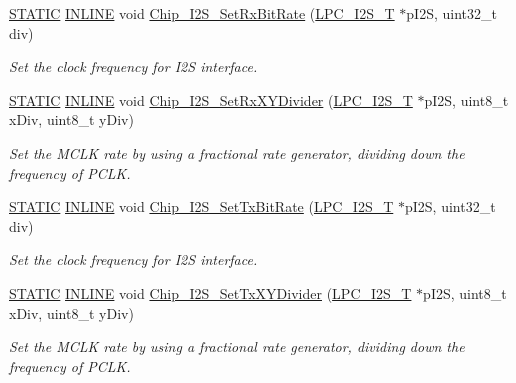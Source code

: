 \begin{DoxyCompactItemize}
\hyperlink{group__LPC__Types__Public__Macros_ga10b2d890d871e1489bb02b7e70d9bdfb}{S\+T\+A\+T\+IC} \hyperlink{group__LPC__Types__Public__Types_ga2eb6f9e0395b47b8d5e3eeae4fe0c116}{I\+N\+L\+I\+NE} void \hyperlink{group__I2S__17XX__40XX_gaf18685ebc3f86581fd7075fafe4c72e7}{Chip\+\_\+\+I2\+S\+\_\+\+Set\+Rx\+Bit\+Rate} (\hyperlink{structLPC__I2S__T}{L\+P\+C\+\_\+\+I2\+S\+\_\+T} $\ast$p\+I2S, uint32\+\_\+t div)
\begin{DoxyCompactList}\small\item\em Set the clock frequency for I2S interface. \end{DoxyCompactList}\item 
\hyperlink{group__LPC__Types__Public__Macros_ga10b2d890d871e1489bb02b7e70d9bdfb}{S\+T\+A\+T\+IC} \hyperlink{group__LPC__Types__Public__Types_ga2eb6f9e0395b47b8d5e3eeae4fe0c116}{I\+N\+L\+I\+NE} void \hyperlink{group__I2S__17XX__40XX_gafd2bc55fb29ea5f082d5ae3b5794f605}{Chip\+\_\+\+I2\+S\+\_\+\+Set\+Rx\+X\+Y\+Divider} (\hyperlink{structLPC__I2S__T}{L\+P\+C\+\_\+\+I2\+S\+\_\+T} $\ast$p\+I2S, uint8\+\_\+t x\+Div, uint8\+\_\+t y\+Div)
\begin{DoxyCompactList}\small\item\em Set the M\+C\+LK rate by using a fractional rate generator, dividing down the frequency of P\+C\+LK. \end{DoxyCompactList}\item 
\hyperlink{group__LPC__Types__Public__Macros_ga10b2d890d871e1489bb02b7e70d9bdfb}{S\+T\+A\+T\+IC} \hyperlink{group__LPC__Types__Public__Types_ga2eb6f9e0395b47b8d5e3eeae4fe0c116}{I\+N\+L\+I\+NE} void \hyperlink{group__I2S__17XX__40XX_ga4ab6d7b26edf92c1b7bcb7f6f9326888}{Chip\+\_\+\+I2\+S\+\_\+\+Set\+Tx\+Bit\+Rate} (\hyperlink{structLPC__I2S__T}{L\+P\+C\+\_\+\+I2\+S\+\_\+T} $\ast$p\+I2S, uint32\+\_\+t div)
\begin{DoxyCompactList}\small\item\em Set the clock frequency for I2S interface. \end{DoxyCompactList}\item 
\hyperlink{group__LPC__Types__Public__Macros_ga10b2d890d871e1489bb02b7e70d9bdfb}{S\+T\+A\+T\+IC} \hyperlink{group__LPC__Types__Public__Types_ga2eb6f9e0395b47b8d5e3eeae4fe0c116}{I\+N\+L\+I\+NE} void \hyperlink{group__I2S__17XX__40XX_gaab4e4a66774d56ba378cce2dbc34e9b0}{Chip\+\_\+\+I2\+S\+\_\+\+Set\+Tx\+X\+Y\+Divider} (\hyperlink{structLPC__I2S__T}{L\+P\+C\+\_\+\+I2\+S\+\_\+T} $\ast$p\+I2S, uint8\+\_\+t x\+Div, uint8\+\_\+t y\+Div)
\begin{DoxyCompactList}\small\item\em Set the M\+C\+LK rate by using a fractional rate generator, dividing down the frequency of P\+C\+LK. \end{DoxyCompactList}\item 

\end{DoxyCompactItemize}
